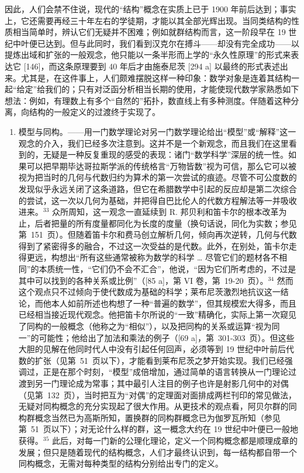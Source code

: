 因此，人们会禁不住说，现代的“结构”概念在实质上已于 1900 年前后达到；事实上，它还需要再经三十年左右的学徒期，才能以其全部光辉出现。当同类结构的性质相当简单时，辨认它们无疑并不困难；例如就群结构而言，这一阶段早在 19 世纪中叶便已达到。但与此同时，我们看到汉克尔在搏斗——却没有完全成功——以提炼出域和扩张的一般观念，他只能以一条半形而上学的“永久性原理”的形式来表达它 {[}146{]}，而这条原理要到 40 年后才由施泰尼茨 {[}294 a{]} 以最终的形式表述出来。尤其是，在这件事上，人们颇难摆脱这样一种印象：数学对象是连着其结构一起“给定”给我们的；只有对泛函分析相当长期的使用，才能使现代数学家熟悉如下想法：例如，有理数上有多个“自然的”拓扑，数直线上有多种测度。伴随着这种分离，向结构的一般定义的过渡终于实现了。

\begin{enumerate}
\def\labelenumi{\Alph{enumi})}
\setcounter{enumi}{1}
\item
  模型与同构。——用一门数学理论对另一门数学理论给出“模型”或“解释”这一观念的介入，我们已经多次注意到。这并不是一个新观念，而且我们在这里看到的，无疑是一种反复重现的感受的表现：诸门“数学科学”深层的统一性。如果可以把早期毕达哥拉斯学派的传统格言“万物皆数”视为可信，那么它可以被视为把当时的几何与代数归约为算术的第一次尝试的痕迹。尽管不可公度数的发现似乎永远关闭了这条道路，但它在希腊数学中引起的反应却是第二次综合的尝试，这一次以几何为基础，并把得自巴比伦人的代数方程解法等一并吸收进来。\(^{33}\) 众所周知，这一观念一直延续到 R. 邦贝利和笛卡尔的根本改革为止，后者把量的所有度量都同化为长度的度量（换句话说，同化为实数；参见第~151~页）。但随着笛卡尔和费马创立解析几何，倾向再次逆转，几何与代数得到了紧密得多的融合，不过这一次受益的是代数。此外，在别处，笛卡尔走得更远，构想出“所有这些通常被称为数学的科学 \ldots{} 尽管它们的题材各不相同”的本质统一性，“它们仍不会不汇合”，他说，“因为它们所考虑的，不过是其中可以找到的各种关系或比例”（{[}85 a{]}，第 VI 卷，第~19-20~页）。\(^{34}\) 然而这个观点只不过倾向于使代数成为基础的科学；莱布尼茨激烈地抗议这一结论，而他本人如前所述也构想了一种“普遍的数学”，但其规模宏大得多，而且已经相当接近现代观念。他把笛卡尔所说的“一致”精确化，实际上第一次窥见了同构的一般概念（他称之为“相似”），以及把同构的关系或运算“视为同一”的可能性；他给出了加法和乘法的例子（{[}69 a{]}，第~301-303~页）。但这些大胆的见解在他同时代人中没有引起任何回声，必须等到 19 世纪中叶前后代数的扩张（见第~51~页以下），才能看到莱布尼茨之梦开始实现。我们已经强调过，正是在那个时刻，“模型”成倍增加，通过简单的语言转换从一门理论过渡到另一门理论成为常事；其中最引人注目的例子也许是射影几何中的对偶（见第~132~页），当时把互为“对偶”的定理面对面排成两栏刊印的常见做法，无疑对同构概念的充分实现起了很大作用。从更技术的观点看，阿贝尔群的同构群概念当然已为高斯所知，置换群的同构群概念已为伽罗瓦所知（参见第~51~页以下）；对无论什么样的群，这一概念大约在 19 世纪中叶便已一般地获得。\(^{35}\) 此后，对每一门新的公理化理论，定义一个同构概念都是顺理成章的发展；但只是随着现代的结构概念，人们才最终认识到，每一结构都自带一个同构概念，无需对每种类型的结构分别给出专门的定义。

\end{enumerate}
